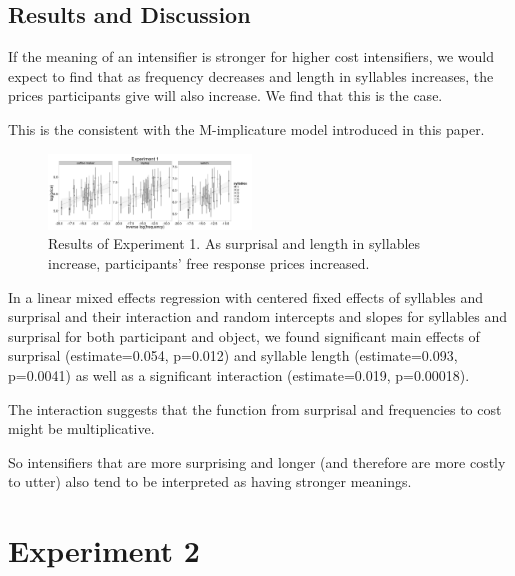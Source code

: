 \documentclass[10pt,letterpaper]{article}
\begin{document}
\subsection{Results and Discussion}

If the meaning of an intensifier is stronger for higher cost intensifiers, we would expect to find that as frequency decreases and length in syllables increases, the prices participants give will also increase. We find that this is the case.

This is the consistent with the M-implicature model introduced in this paper.



\begin{figure}[ht]
\begin{center}
\includegraphics[width=0.48\textwidth]{analysis_files_for_writeup/images/exp1-plot.png}
\end{center}
\caption{Results of Experiment 1. As surprisal and length in syllables increase, participants' free response prices increased.} 
\label{exp1-plot}
\end{figure}

In a linear mixed effects regression with centered fixed effects of syllables and surprisal and their interaction and random intercepts and slopes for syllables and surprisal for both participant and object, we found significant main effects of surprisal (estimate=0.054, p=0.012) and syllable length  (estimate=0.093, p=0.0041) as well as a significant interaction (estimate=0.019, p=0.00018).

The interaction suggests that the function from surprisal and frequencies to cost might be multiplicative.

So intensifiers that are more surprising and longer (and therefore are more costly to utter) also tend to be interpreted as having stronger meanings.


\section{Experiment 2}
\end{document}
